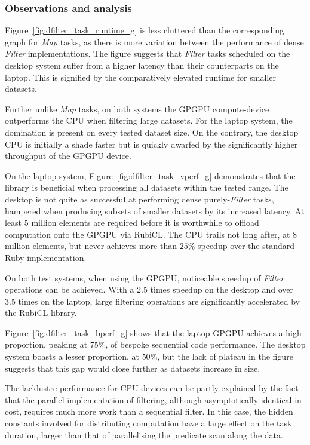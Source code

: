 \subsubsection{Observations and analysis}
Figure~\ref{fig:dfilter_task_runtime_g} is less cluttered than the corresponding graph for \emph{Map} tasks, as there is more variation between the performance of dense \emph{Filter} implementations.
The figure suggests that \emph{Filter} tasks scheduled on the desktop system suffer from a higher latency than their counterparts on the laptop. This is signified by the comparatively elevated runtime for smaller datasets.

Further unlike \emph{Map} tasks, on both systems the \ac{GPGPU} compute-device outperforms the \ac{CPU} when filtering large datasets. For the laptop system, the domination is present on every tested dataset size. On the contrary, the desktop \ac{CPU} is initially a shade faster but is quickly dwarfed by the significantly higher throughput of the \ac{GPGPU} device.

On the laptop system, Figure~\ref{fig:dfilter_task_vperf_g} demonstrates that the library is beneficial when processing all datasets within the tested range. The desktop is not quite as successful at performing dense purely-\emph{Filter} tasks, hampered when producing subsets of smaller datasets by its increased latency. At least $5$ million elements are required before it is worthwhile to offload computation onto the \ac{GPGPU} via RubiCL. The \ac{CPU} trails not long after, at $8$ million elements, but never achieves more than $25\%$ speedup over the standard Ruby implementation.

On both test systems, when using the \ac{GPGPU}, noticeable speedup of \emph{Filter} operations can be achieved. With a $2.5$ times speedup on the desktop and over $3.5$ times on the laptop, large filtering operations are significantly accelerated by the RubiCL library.

Figure~\ref{fig:dfilter_task_bperf_g} shows that the laptop \ac{GPGPU} achieves a high proportion, peaking at $75\%$, of bespoke sequential code performance. The desktop system boasts a lesser proportion, at $50\%$, but the lack of plateau in the figure suggests that this gap would close further as datasets increase in size.

The lacklustre performance for \ac{CPU} devices can be partly explained by the fact that the parallel implementation of filtering, although asymptotically identical in cost, requires much more work than a sequential filter. In this case, the hidden constants involved for distributing computation have a large effect on the task duration, larger than that of parallelising the predicate scan along the data.

